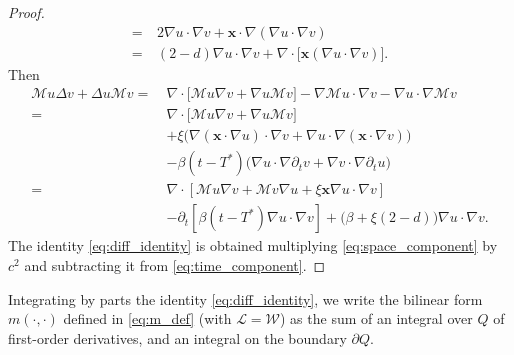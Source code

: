 \documentclass[a4paper]{article}
\theoremstyle{plain}
\theoremstyle{definition}
\newcommand{\operator}[1]{\mathcal{#1}}
\newcommand{\Div}[1]{\nabla \cdot #1}
\newcommand{\Grad}[1]{\nabla #1}
\newcommand{\Lap}[1]{\Delta #1}
\newcommand{\TimeDer}{{\partial^{}_t}}
\newcommand{\vect}[1]{\bm{#1}}
\newcommand{\oL}{{\operator{L}}}
\newcommand{\oM}{{\operator{M}}}
\newcommand{\oW}{{\operator{W}}}
\newcommand{\vx}{{\vect x}}
\begin{document}
\begin{proof}
\begin{align*}
		= & \ 2\Grad u\cdot\Grad v + \vx\cdot \Grad(\Grad u\cdot\Grad v)                                \\
		= & \ (2-d)\Grad u\cdot\Grad v + \Div\big[\vx (\Grad u\cdot\Grad v)\big].
	\end{align*}
	Then
	\begin{align}
		\nonumber
		\operator{M}u \Lap v + \Lap u \operator{M}v
		=\  & \Div \big[\operator{M}u \Grad v + \Grad u\operator{M}v \big] - \Grad \oM u \cdot \Grad v- \Grad u \cdot \Grad\oM v     \\
		\nonumber
		=\  & \Div \big[\operator{M}u \Grad v + \Grad u\operator{M}v \big]                                                           \\
		\nonumber
		    & +\xi\big(\Grad(\vx\cdot\Grad u)\cdot\Grad v+\Grad u\cdot\Grad(\vx\cdot\Grad v)\big)                                    \\ &
		\label{eq:space_component}
		- \beta(t-T^*)\big(\Grad u \cdot \Grad \TimeDer{v} + \Grad v \cdot \Grad \TimeDer{u}\big)
		\\
		\nonumber
		=\  & \Div \left[\operator{M}u \Grad v + \operator{M}v \Grad u + \xi \vect{x} \Grad u \cdot \Grad v\right]                   \\
		\nonumber
		    & - \TimeDer{} \left[\beta (t-T^*) \Grad u \cdot \Grad v\right] + \bigl(\beta + \xi (2 - d)\bigr) \Grad u \cdot \Grad v.
	\end{align}
The identity \eqref{eq:diff_identity} is obtained multiplying \eqref{eq:space_component} by $c^2$ and subtracting it from \eqref{eq:time_component}.
\end{proof}

Integrating by parts the identity \eqref{eq:diff_identity}, we write the bilinear form $m(\cdot,\cdot)$ defined in \eqref{eq:m_def} (with $\oL=\oW$) as the sum of an integral over $Q$ of first-order derivatives, and an integral on the boundary $\partial Q$.
\end{document}
